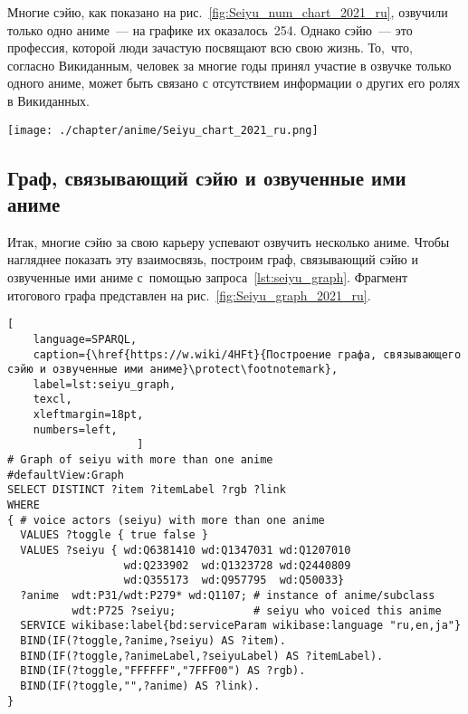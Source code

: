 Многие сэйю, как показано на рис.~\ref{fig:Seiyu_num_chart_2021_ru}, 
озвучили только одно аниме~--- на графике их оказалось~254. 
Однако сэйю~--- это профессия, которой люди зачастую посвящают всю свою жизнь. 
То,~что, согласно Викиданным, человек за многие годы принял участие в озвучке только одного аниме, 
может быть связано с отсутствием информации о других его ролях в Викиданных. 

\begin{figure*}[h]
    \texttt{[image: ./chapter/anime/Seiyu\_chart\_2021\_ru.png]}%
	\caption[График числа ролей, озвученных различными сэйю, 2021 год.]{График числа ролей, озвученных различными сэйю, 2021 год.\\График построен на~основе данных, полученных с~помощью запроса~\protect\ref{lst:seiyu_titles_graph}}%
    \label{fig:Seiyu_num_chart_2021_ru}%
\end{figure*} 




\newpage
\subsection{Граф, связывающий сэйю и озвученные ими аниме}

Итак, многие сэйю за свою карьеру успевают озвучить несколько аниме. 
Чтобы нагляднее показать эту взаимосвязь, 
построим граф, связывающий сэйю и озвученные ими аниме с~помощью запроса~\ref{lst:seiyu_graph}. 
Фрагмент итогового графа представлен на рис.~\ref{fig:Seiyu_graph_2021_ru}. 


\lstset{numbers=left, firstnumber=1, frame=single, texcl}
\begin{lstlisting}[ 
    language=SPARQL, 
    caption={\href{https://w.wiki/4HFt}{Построение графа, связывающего сэйю и озвученные ими аниме}\protect\footnotemark},
    label=lst:seiyu_graph,
    texcl,
    xleftmargin=18pt, 
    numbers=left,
                    ]
# Graph of seiyu with more than one anime
#defaultView:Graph
SELECT DISTINCT ?item ?itemLabel ?rgb ?link
WHERE
{ # voice actors (seiyu) with more than one anime
  VALUES ?toggle { true false }
  VALUES ?seiyu { wd:Q6381410 wd:Q1347031 wd:Q1207010 
                  wd:Q233902  wd:Q1323728 wd:Q2440809 
                  wd:Q355173  wd:Q957795  wd:Q50033}
  ?anime  wdt:P31/wdt:P279* wd:Q1107; # instance of anime/subclass
          wdt:P725 ?seiyu;            # seiyu who voiced this anime 
  SERVICE wikibase:label{bd:serviceParam wikibase:language "ru,en,ja"}
  BIND(IF(?toggle,?anime,?seiyu) AS ?item).
  BIND(IF(?toggle,?animeLabel,?seiyuLabel) AS ?itemLabel).
  BIND(IF(?toggle,"FFFFFF","7FFF00") AS ?rgb).
  BIND(IF(?toggle,"",?anime) AS ?link).
}
\end{lstlisting}%
\lstset{numbers=none}

